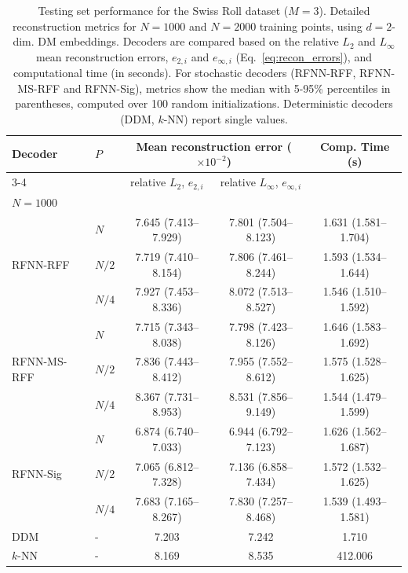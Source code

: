 \documentclass{article}
\begin{document}
\begin{table}[htbp]
\centering
\caption{Testing set performance for the Swiss Roll dataset ($M=3$). Detailed reconstruction metrics for $N=1000$ and $N=2000$ training points, using $d=2$-dim. DM embeddings. Decoders are compared based on the relative $L_2$ and $L_\infty$ mean reconstruction errors, $e_{2,i}$ and $e_{\infty,i}$ (Eq.~\eqref{eq:recon_errors}), and computational time (in seconds). For stochastic decoders (RFNN-RFF, RFNN-MS-RFF and RFNN-Sig), metrics show the median with 5-95\% percentiles in parentheses, computed over 100 random initializations. Deterministic decoders (DDM, $k$-NN) report single values.}
\label{tab:SR_dec_ts_all}
\begin{tabular}{@{}llccc@{}}
\multirow{2}{*}{Decoder} & \multirow{2}{*}{$P$} & \multicolumn{2}{c}{Mean reconstruction error ($\times 10^{-2}$)} & \multirow{2}{*}{Comp. Time (s)} \\
\cmidrule(lr){3-4}
& & relative $L_2$, $e_{2,i}$ &  relative $L_\infty$, $e_{\infty,i}$ &  \\
\midrule
\multicolumn{5}{l}{\textbf{$N=1000$}} \\
\midrule
\midrule

\multirow{3}{*}{RFNN-RFF} 
&	$N$	    & 7.645 (7.413--7.929) & 7.801 (7.504--8.123) & 1.631 (1.581--1.704) \\
&	$N/2$   & 7.719 (7.410--8.154) & 7.806 (7.461--8.244) & 1.593 (1.534--1.644) \\
&	$N/4$   & 7.927 (7.453--8.336) & 8.072 (7.513--8.527) & 1.546 (1.510--1.592) \\
\midrule

\multirow{3}{*}{RFNN-MS-RFF} 
&	$N$	    & 7.715 (7.343--8.038) & 7.798 (7.423--8.126) & 1.646 (1.583--1.692) \\
&	$N/2$	& 7.836 (7.443--8.412) & 7.955 (7.552--8.612) & 1.575 (1.528--1.625) \\
&	$N/4$	& 8.367 (7.731--8.953) & 8.531 (7.856--9.149) & 1.544 (1.479--1.599) \\
\midrule

\multirow{3}{*}{RFNN-Sig} 
& $N$       & 6.874 (6.740--7.033) & 6.944 (6.792--7.123) & 1.626 (1.562--1.687) \\
& $N/2$     & 7.065 (6.812--7.328) & 7.136 (6.858--7.434) & 1.572 (1.532--1.625) \\
& $N/4$     & 7.683 (7.165--8.267) & 7.830 (7.257--8.468) & 1.539 (1.493--1.581) \\
\midrule
DDM  & -  & 7.203 & 7.242 & 1.710 \\
$k$-NN & -  & 8.169 & 8.535 & 412.006 \\


\end{tabular}
\end{table}
\end{document}
